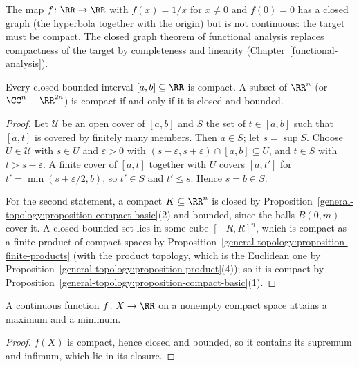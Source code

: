 \begin{counterexample}\label{general-topology:counterexample-closed-graph}
The map $f \colon \RR \to \RR$ with $f(x) = 1/x$ for $x \neq 0$ and $f(0) = 0$ has a closed graph (the hyperbola together with the origin) but is not continuous: the target must be compact. The closed graph theorem of functional analysis
replaces compactness of the target by completeness and linearity (Chapter~\ref{functional-analysis}).
\end{counterexample}

\begin{theorem}\label{general-topology:theorem-heine-borel}
Every closed bounded interval $[a, b] \subseteq \RR$ is compact. A subset of $\RR^n$ (or $\CC^n = \RR^{2n}$) is compact if and only if it is closed
and bounded.
\end{theorem}

\begin{proof}
Let $\mathcal{U}$ be an open cover of $[a, b]$ and $S$ the set of $t \in [a, b]$ such that $[a, t]$ is covered by finitely many members. Then $a \in S$;
let $s = \sup S$. Choose $U \in \mathcal{U}$ with $s \in U$ and $\varepsilon > 0$ with $(s - \varepsilon, s + \varepsilon) \cap [a, b] \subseteq U$, and
$t \in S$ with $t > s - \varepsilon$. A finite cover of $[a, t]$ together with $U$ covers $[a, t']$ for
$t' = \min(s + \varepsilon/2, b)$, so $t' \in S$ and $t' \leq s$. Hence $s = b \in S$.

For the second statement, a compact
$K \subseteq \RR^n$ is closed by Proposition~\ref{general-topology:proposition-compact-basic}(2) and bounded, since the balls $B(0, m)$ cover it. A
closed bounded set lies in some cube $[-R, R]^n$, which is compact as a finite product of compact spaces by Proposition~\ref{general-topology:proposition-finite-products} (with the product topology, which is the
Euclidean one by Proposition~\ref{general-topology:proposition-product}(4)); so it is compact by
Proposition~\ref{general-topology:proposition-compact-basic}(1).
\end{proof}

\begin{corollary}\label{general-topology:corollary-extreme-value}
A continuous function $f \colon X \to \RR$ on a nonempty compact space attains a maximum and a minimum.
\end{corollary}

\begin{proof}
$f(X)$ is compact, hence closed and bounded, so it contains its supremum and infimum, which lie in its closure.
\end{proof}

